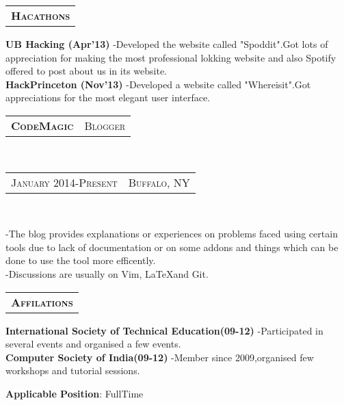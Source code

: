 \documentclass[10pt,a4paper,oneside]{article}
\begin{document}
\begin{minipage}[t]{0.33\textwidth}
        \vspace{10pt}
        \begin{tabular}{c}
        \textbf{\normalsize H\textsc{acathons}}\\
        \end{tabular}
        \begin{adjustwidth}{7pt}{0pt}
            {\footnotesize \textbf{UB Hacking (Apr'13)} -Developed the website called "Spoddit".Got lots of appreciation for 
            making the most professional lokking website and also Spotify offered to post about us in its website.}\\
            {\footnotesize \textbf{HackPrinceton (Nov'13)} -Developed a website called "Whereisit".Got appreciations for the
            most elegant user interface.}
            \vspace{0pt}\\
        \end{adjustwidth}
        \begin{tabular}{c|c}
            \textbf{\normalsize C\textsc{ode}M\textsc{agic}}
            &\textmd{\normalsize B\textsc{logger}}
        \end{tabular}\\
        \textcolor{light-gray}{
            \begin{tabular}{c|c}
                {\small J\textsc{anuary 2014}-P\textsc{resent}}
                &{\small B\textsc{uffalo}, NY}
            \end{tabular}
        }\\ 
        \vspace{-4mm}
        \begin{adjustwidth}{7pt}{0pt}
            {\footnotesize -The blog provides explanations or experiences on problems faced using certain tools due to lack
            of documentation or on some addons and things which can be done to use the tool more efficently.}\\
            {\footnotesize -Discussions are usually on Vim, \LaTeX and Git. }
        \end{adjustwidth}
        \vspace{10pt}
        \begin{tabular}{c}
        \textbf{\normalsize A\textsc{ffilations}}\\
        \end{tabular}
        \begin{adjustwidth}{7pt}{0pt}
            {\footnotesize \textbf{International Society of Technical Education(09-12)} -Participated in several events and
            organised a few events.}\\
            {\footnotesize \textbf{Computer Society of India(09-12)} -Member since 2009,organised few workshops and
        tutorial sessions.}
            \vspace{0pt}\\
        \end{adjustwidth} 
        {\small \textbf{Applicable Position}: FullTime}
    \end{minipage}
\end{document}
